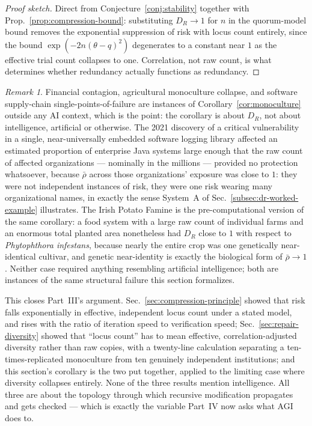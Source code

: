 \documentclass[11pt,a4paper]{article}
\theoremstyle{plain}
\theoremstyle{definition}
\theoremstyle{remark}
\newtheorem{remark}[theorem]{Remark}
\newcommand{\DR}{D_R}
\begin{document}
\begin{proof}[Proof sketch]
Direct from Conjecture~\ref{conj:stability} together with Prop.~\ref{prop:compression-bound}: substituting $\DR \to 1$ for $n$ in the quorum-model bound removes the exponential suppression of risk with locus count entirely, since the bound $\exp(-2n(\theta-q)^2)$ degenerates to a constant near $1$ as the effective trial count collapses to one. Correlation, not raw count, is what determines whether redundancy actually functions as redundancy.
\end{proof}

\begin{remark}
Financial contagion, agricultural monoculture collapse, and software supply-chain single-points-of-failure are instances of Corollary~\ref{cor:monoculture} outside any AI context, which is the point: the corollary is about $\DR$, not about intelligence, artificial or otherwise. The 2021 discovery of a critical vulnerability in a single, near-universally embedded software logging library affected an estimated proportion of enterprise Java systems large enough that the raw count of affected organizations — nominally in the millions — provided no protection whatsoever, because $\bar\rho$ across those organizations' exposure was close to $1$: they were not independent instances of risk, they were one risk wearing many organizational names, in exactly the sense System~A of Sec.~\ref{subsec:dr-worked-example} illustrates. The Irish Potato Famine is the pre-computational version of the same corollary: a food system with a large raw count of individual farms and an enormous total planted area nonetheless had $\DR$ close to $1$ with respect to \emph{Phytophthora infestans}, because nearly the entire crop was one genetically near-identical cultivar, and genetic near-identity is exactly the biological form of $\bar\rho \to 1$. Neither case required anything resembling artificial intelligence; both are instances of the same structural failure this section formalizes.
\end{remark}

This closes Part~III's argument. Sec.~\ref{sec:compression-principle} showed that risk falls exponentially in effective, independent locus count under a stated model, and rises with the ratio of iteration speed to verification speed; Sec.~\ref{sec:repair-diversity} showed that ``locus count'' has to mean effective, correlation-adjusted diversity rather than raw copies, with a twenty-line calculation separating a ten-times-replicated monoculture from ten genuinely independent institutions; and this section's corollary is the two put together, applied to the limiting case where diversity collapses entirely. None of the three results mention intelligence. All three are about the topology through which recursive modification propagates and gets checked — which is exactly the variable Part~IV now asks what AGI does to.
\end{document}
